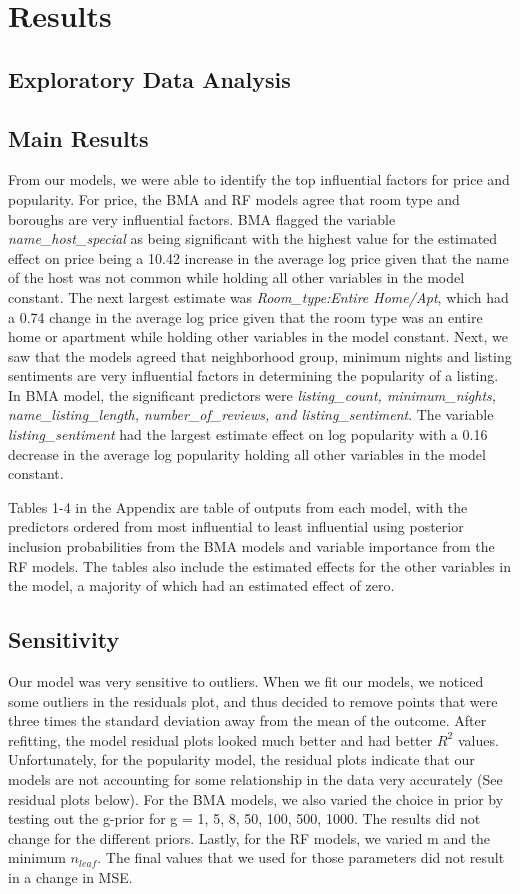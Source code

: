 \documentclass{article}
\begin{document}
\section{Results}

\subsection{Exploratory Data Analysis} 

\subsection{Main Results} 

From our models, we were able to identify the top influential factors for price and popularity. For price, the BMA and RF models agree that room type and boroughs are very influential factors. BMA flagged the variable \textit{name_host_special} as being significant with the highest value for the estimated effect on price being a 10.42 increase in the average log price given that the name of the host was not common while holding all other variables in the model constant. The next largest estimate was \textit{Room_type:Entire Home/Apt}, which had a 0.74 change in the average log price given that the room type was an entire home or apartment while holding other variables in the model constant. Next, we saw that the models agreed that neighborhood group, minimum nights and listing sentiments are very influential factors in determining the popularity of a listing. In BMA model, the significant predictors were \textit{listing_count, minimum_nights, name_listing_length, number_of_reviews, and listing_sentiment}. The variable \textit{listing_sentiment} had the largest estimate effect on log popularity with a 0.16 decrease in the average log popularity holding all other variables in the model constant. 

Tables 1-4 in the Appendix are table of outputs from each model, with the predictors ordered from most influential to least influential using posterior inclusion probabilities from the BMA models and variable importance from the RF models. The tables also include the estimated effects for the other variables in the model, a majority of which had an estimated effect of zero. 


\subsection{Sensitivity} 
Our model was very sensitive to outliers. When we fit our models, we noticed some outliers in the residuals plot, and thus decided to remove points that were three times the standard deviation away from the mean of the outcome. After refitting, the model residual plots looked much better and had better $R^2$ values. Unfortunately, for the popularity model, the residual plots indicate that our models are not accounting for some relationship in the data very accurately (See residual plots below). For the BMA models, we also varied the choice in prior by testing out the g-prior for g = 1, 5, 8, 50, 100, 500, 1000. The results did not change for the different priors. Lastly, for the RF models, we varied m and the minimum $n_{leaf}$. The final values that we used for those parameters did not result in a change in MSE. 
\end{document}
